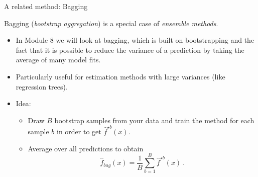 \documentclass[
  10pt,
  ignorenonframetext,
]{beamer}
\providecommand{\tightlist}{%
  \setlength{\itemsep}{0pt}\setlength{\parskip}{0pt}}
\begin{document}
\begin{frame}
\begin{block}{A related method: Bagging}
\protect\hypertarget{a-related-method-bagging}{}
\vspace{2mm}

Bagging (\emph{bootstrap aggregation}) is a special case of
\emph{ensemble methods}.

\vspace{2mm}

\begin{itemize}
\tightlist
\item
  In Module 8 we will look at bagging, which is built on bootstrapping
  and the fact that it is possible to reduce the variance of a
  prediction by taking the average of many model fits.
\end{itemize}

\vspace{2mm}

\begin{itemize}
\tightlist
\item
  Particularly useful for estimation methods with large variances (like
  regression trees).
\end{itemize}

\vspace{2mm}

\begin{itemize}
\tightlist
\item
  Idea:

  \begin{itemize}
  \tightlist
  \item
    Draw \(B\) bootstrap samples from your data and train the method for
    each sample \(b\) in order to get \(\hat{f}^{\star b}(x)\).
  \item
    Average over all predictions to obtain
    \[\hat{f}_{bag}(x) = \frac{1}{B} \sum_{b=1}^B \hat{f}^{\star b}(x) \ .\]
  \end{itemize}
\end{itemize}
\end{block}
\end{frame}
\end{document}
